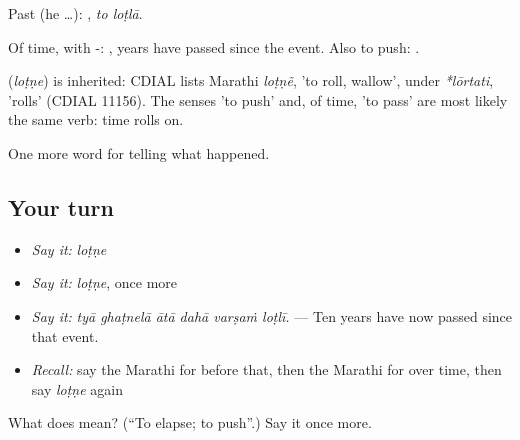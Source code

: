 Past (he …):  , \emph{to loṭlā}.

Of time, with -:   , years have passed since the event. Also to push:  .

\begin{cousinweb}
\textbf{} (\emph{loṭṇe}) is inherited: CDIAL lists Marathi \emph{loṭṇẽ}, 'to roll, wallow', under \emph{*lōrtati}, 'rolls' (CDIAL 11156). The senses 'to push' and, of time, 'to pass' are most likely the same verb: time rolls on.
\end{cousinweb}

\begin{grammarlens}[title={What you've built}]
One more word for telling what happened.
\end{grammarlens}

\subsection*{Your turn}
\begin{itemize}
\raggedright
  \item \emph{Say it:} \emph{loṭṇe}
  \item \emph{Say it:} \emph{loṭṇe}, once more
  \item \emph{Say it:} \emph{tyā ghaṭnelā ātā dahā varṣaṁ loṭlī.} — Ten years have now passed since that event.
  \item \emph{Recall:} say the Marathi for before that, then the Marathi for over time, then say \emph{loṭṇe} again
\end{itemize}

\begin{tcolorbox}[breakable,colback=teal!4,colframe=teal!35!black,title={Before you move on}]
What does  mean? (\textquotedblleft{}To elapse; to push\textquotedblright{}.) Say it once more.
\end{tcolorbox}
